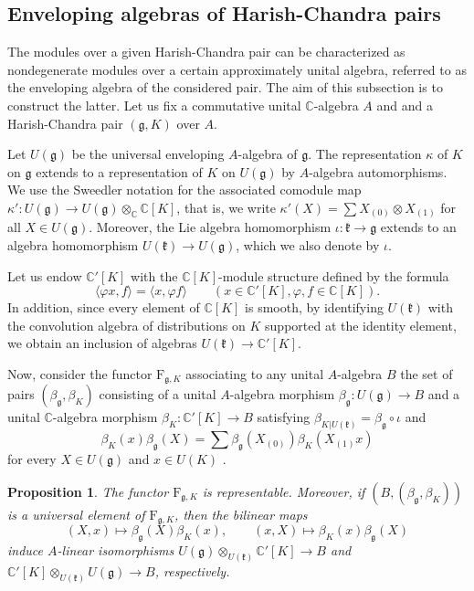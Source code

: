 \documentclass{amsart}
\newtheorem{proposition}[theorem]{Proposition}
\theoremstyle{definition}
\begin{document}
\subsection{Enveloping algebras of Harish-Chandra pairs}\label{UgK}
The modules over a given Harish-Chandra pair can be characterized as nondegenerate modules over a certain approximately unital algebra, referred to as the enveloping algebra of the considered pair. The aim of this subsection is to construct the latter. Let us fix a commutative unital $\mathbb{C}$-algebra $A$ and and a Harish-Chandra pair $(\mathfrak{g},K)$ over $A$.

Let $U(\mathfrak{g})$ be the universal enveloping $A$-algebra of $\mathfrak{g}$. The representation $\kappa$ of $K$ on $\mathfrak{g}$ extends to a representation of $K$ on $U(\mathfrak{g})$ by $A$-algebra automorphisms. We use the Sweedler notation for the associated comodule map $\kappa' : U(\mathfrak{g}) \to U(\mathfrak{g}) \otimes_\mathbb{C} \mathbb{C}[K] $, that is, we write $\kappa'(X) = \sum X_{(0)} \otimes X_{(1)}$ for all $X \in U(\mathfrak{g})$. Moreover, the Lie algebra homomorphism $\iota : \mathfrak{k} \to \mathfrak{g}$ extends to an algebra homomorphism $U(\mathfrak{k}) \to U(\mathfrak{g})$, which we also denote by $\iota$.

Let us endow $\mathbb{C}'[K]$ with the $\mathbb{C}[K]$-module structure defined by the formula
\begin{equation}\label{module_structure_C'}
    \langle \varphi x, f\rangle = \langle x, \varphi f \rangle \qquad (x \in \mathbb{C}'[K], \varphi, f \in \mathbb{C}[K]).
\end{equation}
In addition, since every element of $\mathbb{C}[K]$ is smooth, by identifying $U(\mathfrak{k})$ with the convolution algebra of distributions on $K$ supported at the identity element, we obtain an inclusion of algebras $U(\mathfrak{k}) \to \mathbb{C}'[K]$.

Now, consider the functor $\bm{\mathrm{F}}_{\mathfrak{g},K}$ associating to any unital $A$-algebra $B$ the set of pairs $(\beta_\mathfrak{g},\beta_K)$ consisting of a unital $A$-algebra morphism $\beta_\mathfrak{g} : U(\mathfrak{g}) \to B$ and a unital $\mathbb{C}$-algebra morphism $\beta_K : \mathbb{C}'[K] \to B$ satisfying $\beta_{K|U(\mathfrak{k})} = \beta_\mathfrak{g} \circ \iota$ and
\[\beta_K(x)\beta_\mathfrak{g}(X) =\sum \beta_\mathfrak{g}(X_{(0)})\beta_K( X_{(1)}x) \]
for every $X \in U(\mathfrak{g})$ and $x \in U(K)$ .

\begin{proposition} \label{representable}
    The functor $\bm{\mathrm{F}}_{\mathfrak{g},K}$ is representable. Moreover, if $(B, (\beta_\mathfrak{g}, \beta_K))$ is a universal element of $\bm{\mathrm{F}}_{\mathfrak{g},K}$, then the bilinear maps
    \[(X,x) \longmapsto \beta_\mathfrak{g}(X) \beta_K(x), \qquad (x,X) \longmapsto \beta_K(x) \beta_\mathfrak{g}(X)\]
    induce $A$-linear isomorphisms $U(\mathfrak{g}) \otimes_{U(\mathfrak{k})}\mathbb{C}'[K] \to B$ and $\mathbb{C}'[K]\otimes_{U(\mathfrak{k})}U(\mathfrak{g})\to B$, respectively.
    \[  \]
\end{proposition}
\end{document}
